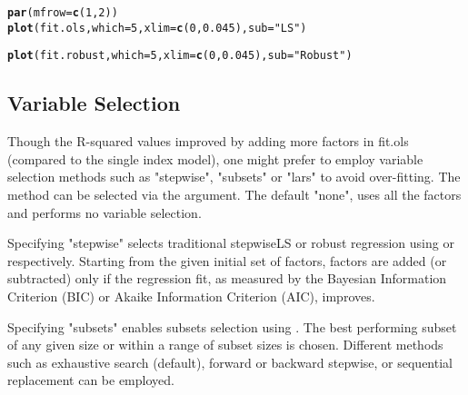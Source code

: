 \documentclass[a4paper]{article}\usepackage[]{graphicx}\usepackage[]{color}
\makeatletter
\newcommand{\hlnum}[1]{\textcolor[rgb]{0.686,0.059,0.569}{#1}}%
\newcommand{\hlstr}[1]{\textcolor[rgb]{0.192,0.494,0.8}{#1}}%
\newcommand{\hlstd}[1]{\textcolor[rgb]{0.345,0.345,0.345}{#1}}%
\newcommand{\hlkwc}[1]{\textcolor[rgb]{0.333,0.667,0.333}{#1}}%
\newcommand{\hlkwd}[1]{\textcolor[rgb]{0.737,0.353,0.396}{\textbf{#1}}}%
\newenvironment{kframe}{%
 \def\at@end@of@kframe{}%
 \ifinner\ifhmode%
  \def\at@end@of@kframe{\end{minipage}}%
  \begin{minipage}{\columnwidth}%
 \fi\fi%
 \def\FrameCommand##1{\hskip\@totalleftmargin \hskip-\fboxsep
 \colorbox{shadecolor}{##1}\hskip-\fboxsep
     \hskip-\linewidth \hskip-\@totalleftmargin \hskip\columnwidth}%
 \MakeFramed {\advance\hsize-\width
   \@totalleftmargin\z@ \linewidth\hsize
   \@setminipage}}%
 {\par\unskip\endMakeFramed%
 \at@end@of@kframe}
\newenvironment{knitrout}{}{} %
\makeatother
\begin{document}
\begin{knitrout}
\color{fgcolor}\begin{kframe}
\begin{alltt}
\hlkwd{par}\hlstd{(}\hlkwc{mfrow}\hlstd{=}\hlkwd{c}\hlstd{(}\hlnum{1}\hlstd{,}\hlnum{2}\hlstd{))}
\hlkwd{plot}\hlstd{(fit.ols,} \hlkwc{which}\hlstd{=}\hlnum{5}\hlstd{,} \hlkwc{xlim}\hlstd{=}\hlkwd{c}\hlstd{(}\hlnum{0}\hlstd{,}\hlnum{0.045}\hlstd{),} \hlkwc{sub}\hlstd{=}\hlstr{"LS"}\hlstd{)}
\end{alltt}


{\ttfamily\noindent\bfseries{}}\begin{alltt}
\hlkwd{plot}\hlstd{(fit.robust,} \hlkwc{which}\hlstd{=}\hlnum{5}\hlstd{,} \hlkwc{xlim}\hlstd{=}\hlkwd{c}\hlstd{(}\hlnum{0}\hlstd{,}\hlnum{0.045}\hlstd{),} \hlkwc{sub}\hlstd{=}\hlstr{"Robust"}\hlstd{)}
\end{alltt}


{\ttfamily\noindent\bfseries{}}\end{kframe}
\end{knitrout}

\subsection{Variable Selection}

Though the R-squared values improved by adding more factors in fit.ols (compared to the single index model), one might prefer to employ variable selection methods such as "stepwise", "subsets" or "lars" to avoid over-fitting. The method can be selected via the  argument. The default "none", uses all the factors and performs no variable selection. 

Specifying "stepwise" selects traditional stepwise\footnotemark[3] LS or robust regression using  or  respectively. Starting from the given initial set of factors, factors are added (or subtracted) only if the regression fit, as measured by the Bayesian Information Criterion (BIC) or Akaike Information Criterion (AIC)\footnotemark[4], improves. 

Specifying "subsets" enables subsets selection using . The best performing subset of any given size or within a range of subset sizes is chosen. Different methods such as exhaustive search (default), forward or backward stepwise, or sequential replacement can be employed.
\end{document}
